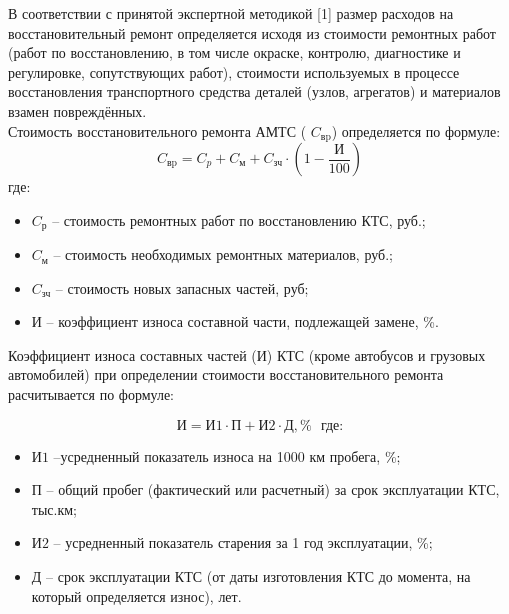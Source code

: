 \par В соответствии с принятой экспертной методикой [1] размер расходов на восстановительный ремонт определяется исходя из стоимости ремонтных работ (работ по восстановлению, в том числе окраске, контролю, диагностике и регулировке, сопутствующих работ), стоимости используемых в процессе восстановления транспортного средства деталей (узлов, агрегатов) и материалов взамен повреждённых.\\
%                                         
Стоимость восстановительного ремонта АМТС ( $ C_\text{вp} $) определяется по формуле:
%
\begin{equation}\label{eq:r}
C_\text{вp} =C_p + C_\text{м} + C_\text{зч}\cdot\left(1-\dfrac{ \text{И}}{100} \right) 
\end{equation}
%
\noindent где:
%
\begin{itemize}
%	
\item[ ]$C_\text {р} $ --  стоимость ремонтных работ по восстановлению КТС, руб.;
\item[ ]$ C_\text{м} $ --  стоимость необходимых ремонтных материалов, руб.;
\item[ ]$ C_\text{зч} $ --  стоимость новых запасных частей, руб;
\item[ ] $ \text{И} $ -- коэффициент износа составной части, подлежащей замене, \%.
\end{itemize}
%
\renewcommand\baselinestretch{1.2}\small\normalsize
%
Коэффициент износа составных частей (И) КТС (кроме автобусов и грузовых автомобилей) при определении стоимости восстановительного ремонта расчитывается по формуле:

\begin{equation}\label{eqsnos}
\text{И} =\text{И1}\cdot\text{П}+\text{И2}\cdot \text{Д}, \%  \,\,\,\, \text{где:}
\end{equation}

\begin{itemize}
	\item [] $ \text{И1} $ --усредненный показатель износа на 1000 км пробега, \%; 
	\item [] $ \text{П} $ -- общий пробег (фактический или расчетный) за срок эксплуатации КТС, тыс.км;
	\item [] $ \text{И2} $ -- усредненный показатель старения за 1 год эксплуатации, \%;
	\item [] $ \text{Д} $ -- срок эксплуатации КТС (от даты изготовления КТС до момента, на который определяется износ), лет. 
\end{itemize}

